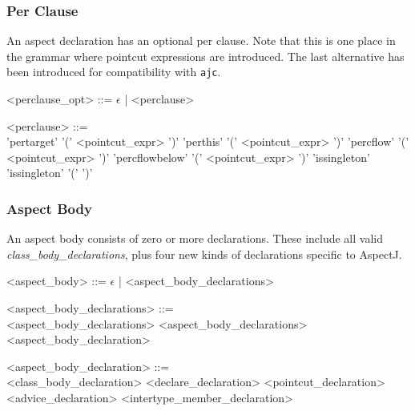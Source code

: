 \subsubsection{Per Clause}

An aspect declaration has an optional per clause.  Note that this is
one place in the grammar where pointcut expressions are introduced.
The last alternative has been introduced for compatibility with
{\tt ajc}.

\begin{minipage}{6in}
\begin{grammar}
<perclause_opt> ::= $\epsilon$ |  <perclause> 

<perclause> ::= \hspace{1in} \\ 
                'pertarget' '(' {\blue <pointcut_expr>} ')'
         \alt   'perthis' '(' {\blue <pointcut_expr>} ')'
         \alt   'percflow' '(' {\blue <pointcut_expr>} ')'
         \alt   'percflowbelow' '(' {\blue <pointcut_expr>} ')'
         \alt   'issingleton'  
         \alt   'issingleton' '(' ')'
\end{grammar}
\end{minipage}

\subsubsection{Aspect Body}

An aspect body consists of zero or more declarations.   These include
all valid {\em class\_body\_declarations},  plus four new kinds of
declarations specific to AspectJ.

\begin{minipage}{6in}
\begin{grammar}
<aspect_body> ::= $\epsilon$ | <aspect_body_declarations> 

<aspect_body_declarations> ::= \hspace{1in} \\
                  <aspect_body_declarations> 
          \alt    <aspect_body_declarations> <aspect_body_declaration>

<aspect_body_declaration> ::= \hspace{1in} \\
                  {\red <class_body_declaration>}
          \alt    <declare_declaration>
          \alt    <pointcut_declaration>
          \alt    <advice_declaration>
          \alt    <intertype_member_declaration>
\end{grammar}
\end{minipage}

